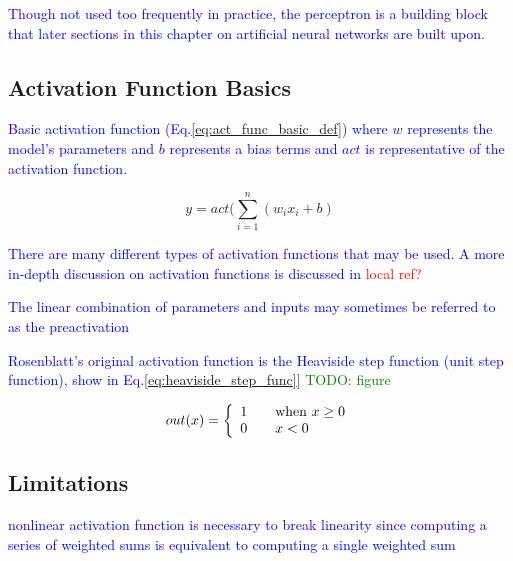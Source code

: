 \textcolor{blue}{Though not used too frequently in practice, the perceptron is a building block that later sections in this chapter on artificial neural networks are built upon.}

\subsection{Activation Function Basics}

\textcolor{blue}{Basic activation function (Eq.\ref{eq:act_func_basic_def}) where $w$ represents the model's parameters and $b$ represents a bias terms and $act$ is representative of the activation function.}

\begin{equation}
{y = act (\sum_{i=1}^{n}(w_i x_i + b)}
\label{eq:act_func_basic_def}
\end{equation}

\textcolor{blue}{There are many different types of activation functions that may be used. A more in-depth discussion on activation functions is discussed in \textcolor{red}{local ref?}}

\textcolor{blue}{The linear combination of parameters and inputs may sometimes be referred to as the preactivation}

\textcolor{blue}{Rosenblatt's original activation function is the {Heaviside step function} ({unit step function}), show in Eq.\ref{eq:heaviside_step_func}] \textcolor{green}{TODO: figure}}

\begin{equation}
{out(x) = \left\{
	\begin{array}{ll}
	1 & \quad $when $ x \geq 0 \\
	0 & \quad x < 0
	\end{array}
	\right.}
\label{eq:heaviside_step_func}
\end{equation}



\subsection{Limitations}

\textcolor{blue}{}

\textcolor{blue}{nonlinear activation function is necessary to break linearity since computing a series of weighted sums is equivalent to computing a single weighted sum}

